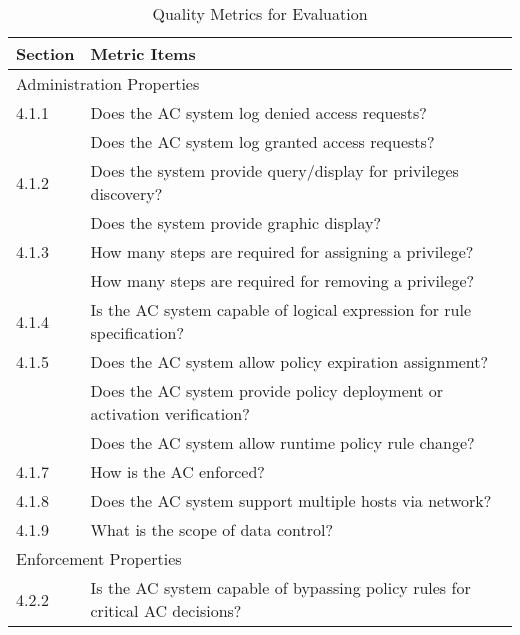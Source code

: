 {   
    \renewcommand{\arraystretch}{1.5}%
    \begin{table}[htb]
        \centering
        \small
        
        \caption{Quality Metrics for Evaluation}
        \label{tab:qualityMetrics}
        \begin{tabular}{l|l}
            \hline \bf Section & \bf Metric Items \\ \hline
            \multicolumn{2}{l}{Administration Properties} \\ \hline
            4.1.1            & \llap{\textbullet} Does the AC system log denied access requests?  \\
                & \llap{\textbullet} Does the AC system log granted access requests? \\ \hline
            4.1.2 & \llap{\textbullet} Does the system provide query/display for privileges discovery? \\
                & \llap{\textbullet} Does the system provide graphic display? \\ \hline
            4.1.3 & \llap{\textbullet} How many steps are required for assigning a privilege? \\
                & \llap{\textbullet} How many steps are required for removing a privilege? \\ \hline
            4.1.4 & \llap{\textbullet} Is the AC system capable of logical expression for rule specification? \\ \hline
            4.1.5 & \llap{\textbullet} Does the AC system allow policy expiration assignment? \\ 
                & \llap{\textbullet} Does the AC system provide policy deployment or activation verification? \\
                & \llap{\textbullet} Does the AC system allow runtime policy rule change? \\ \hline
            4.1.7 & \llap{\textbullet} How is the AC enforced? \\ \hline
            4.1.8 & \llap{\textbullet} Does the AC system support multiple hosts via network? \\ \hline
            4.1.9 & \llap{\textbullet} What is the scope of data control? \\
            \hline \multicolumn{2}{l}{Enforcement Properties} \\ \hline
            4.2.2 & \llap{\textbullet} Is the AC system capable of bypassing policy rules for critical AC decisions? \\ \hline

\end{tabular}
\end{table}}
